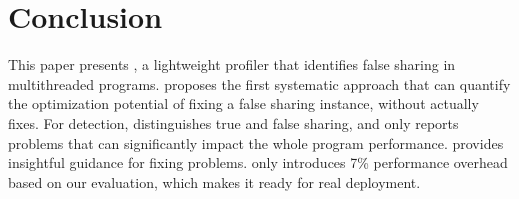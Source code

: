 \section{Conclusion}
\label{sec:conclusion}

This paper presents \cheetah{}, a lightweight profiler that identifies false sharing in multithreaded programs. \cheetah{} proposes the first systematic approach that can quantify the optimization potential of fixing a false sharing instance, without actually fixes. For detection, \cheetah{} distinguishes true and false sharing, and only reports problems that can significantly impact the whole program performance. \cheetah{} provides insightful guidance for fixing problems. \Cheetah{} only introduces 7\% performance overhead based on our evaluation, which makes it ready for real deployment. 


